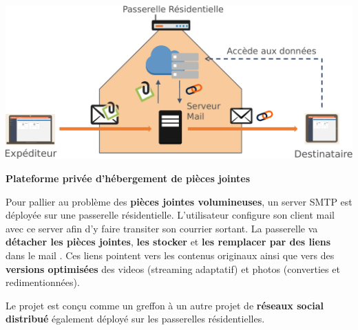 \documentclass[portrait,final,a0paper]{baposter}
\begin{document}
\begin{poster}
{\begin{multicols}{2}
			
			\begin{minipage}{0.5\textwidth}
			\vspace{1em}
				\includegraphics[width=\textwidth]{snapmail}
				\begin{center}\textbf{Plateforme privée d'hébergement de pièces jointes}
				
				\end{center}
				
			\end{minipage}
			
				
			
			Pour pallier au problème des \textbf{pièces jointes volumineuses}, un server SMTP est déployée sur une passerelle résidentielle.
			L'utilisateur configure son client mail avec ce server afin d'y faire transiter son courrier sortant. 
			La passerelle va \textbf{détacher les pièces jointes}, \textbf{les stocker} et \textbf{les remplacer par des liens} dans le mail . Ces liens pointent vers les contenus originaux ainsi que vers des \textbf{versions optimisées} des videos (streaming adaptatif) et photos (converties et redimentionnées).
			
			Le projet est conçu comme un greffon à un autre projet de \textbf{réseaux social distribué } également déployé sur les passerelles résidentielles.
			
			
	\end{multicols}
    }
 
\end{poster}
\end{document}

